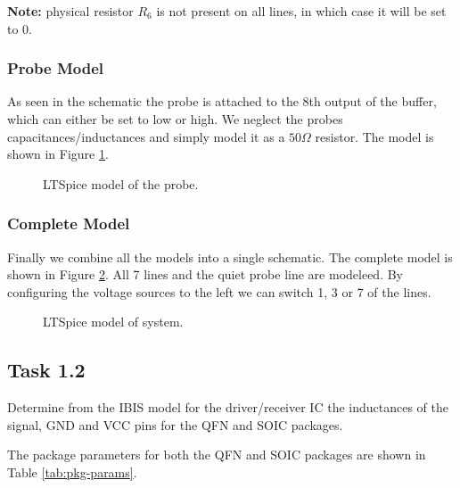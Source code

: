\documentclass[../main.tex]{subfiles}
\begin{document}
\textbf{Note:} physical resistor $R_6$ is not present on all lines, in which case it will be set to 0.

\subsubsection{Probe Model}

As seen in the schematic the probe is attached to the 8th output of the buffer, which can either be set to low or high. We neglect the probes capacitances/inductances and simply model it as a $50\si{\Omega}$ resistor. The model is shown in Figure \ref{fig:probe}.

\begin{figure}[h]
    \centering
    \caption{LTSpice model of the probe.}
    \label{fig:probe}
\end{figure}

\subsubsection{Complete Model}

Finally we combine all the models into a single schematic. The complete model is shown in Figure \ref{fig:complete}. All 7 lines and the quiet probe line are modeleed. By configuring the voltage sources to the left we can switch 1, 3 or 7 of the lines. 

\newpage

\begin{figure}[h]
    \centering
    \caption{LTSpice model of system.}
    \label{fig:complete}
\end{figure}

\newpage

\subsection{Task 1.2}

Determine from the IBIS model for the driver/receiver IC the inductances of the signal, GND and VCC pins for the QFN and SOIC packages.

\solution

The package parameters for both the QFN and SOIC packages are shown in Table \ref{tab:pkg-params}.
\end{document}
